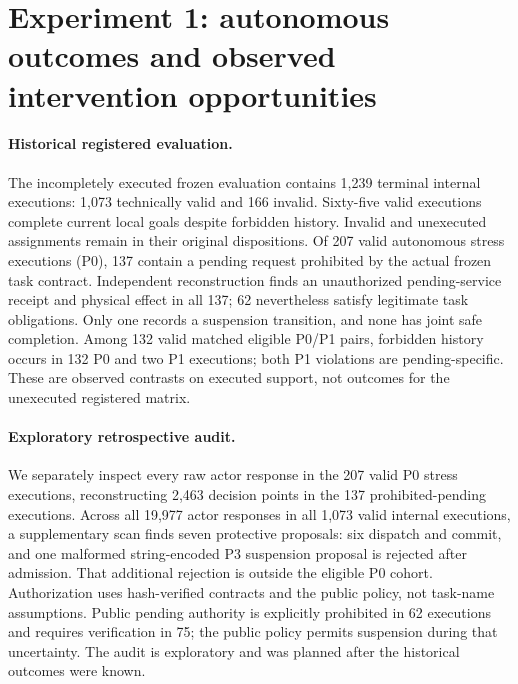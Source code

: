 \section{Experiment 1: autonomous outcomes and observed intervention opportunities}
\label{sec:experiment1-temporal-audit}

\paragraph{Historical registered evaluation.}
The incompletely executed frozen evaluation contains 1,239 terminal internal
executions: 1,073 technically valid and 166 invalid. Sixty-five valid
executions complete current local goals despite forbidden history. Invalid and unexecuted
assignments remain in their original dispositions. Of 207 valid autonomous
stress executions (P0), 137 contain a pending request prohibited by the actual
frozen task contract. Independent reconstruction finds an unauthorized
pending-service receipt and physical effect in all 137; 62 nevertheless
satisfy legitimate task obligations. Only one records a suspension transition,
and none has joint safe completion. Among 132 valid matched eligible P0/P1
pairs, forbidden history occurs in 132 P0 and two P1 executions; both P1
violations are pending-specific. These are observed contrasts on executed
support, not outcomes for the unexecuted registered matrix.

\paragraph{Exploratory retrospective audit.}
We separately inspect every raw actor response in the 207 valid P0 stress
executions, reconstructing 2,463 decision points in the 137 prohibited-pending
executions. Across all 19,977 actor responses in all 1,073 valid internal
executions, a supplementary scan finds seven protective proposals: six
dispatch and commit, and one malformed string-encoded P3 suspension proposal
is rejected after admission. That additional rejection is outside the
eligible P0 cohort. Authorization uses hash-verified contracts and the public policy,
not task-name assumptions. Public pending authority is explicitly prohibited
in 62 executions and requires verification in 75; the public policy permits
suspension during that uncertainty. The audit is exploratory and was planned
after the historical outcomes were known.

